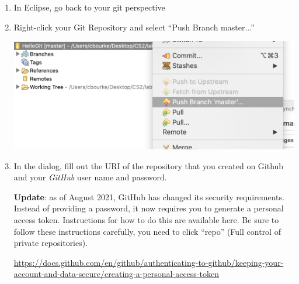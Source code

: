 \documentclass[12pt]{scrartcl}
\begin{document}
\begin{enumerate}
  \item In Eclipse, go back to your git perspective
  \item Right-click your Git Repository and select ``Push Branch master...''
   \begin{center}
	 \includegraphics[scale=0.45]{./hack1.0-files/eclipsePush}
   \end{center}
  \item In the dialog, fill out the URI of the repository that you created
  on Github and your \emph{GitHub} user name and password.
  
    \textbf{Update}: as of August 2021, GitHub has changed its security
  requirements.  Instead of providing a password, it now requires you
  to generate a personal access token.  Instructions for how to do this
  are available here.  Be sure to follow these instructions carefully,
  you need to click ``repo'' (Full control of private repositories).
  
  \url{https://docs.github.com/en/github/authenticating-to-github/keeping-your-account-and-data-secure/creating-a-personal-access-token}
    

\end{enumerate}
\end{document}

